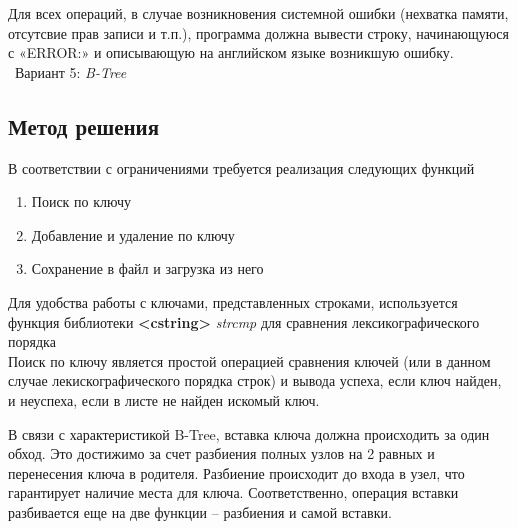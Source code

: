 \documentclass[12pt]{article}
\begin{document}
Для всех операций, в случае возникновения системной ошибки (нехватка памяти, отсутсвие прав записи и т.п.), программа должна вывести строку, начинающуюся с «ERROR:» и описывающую на английском языке возникшую ошибку.\\
  
 \ Вариант 5: \textit{B-Tree}

\subsection*{Метод решения}


В соответствии с ограничениями требуется реализация следующих функций
\begin{enumerate}
\item Поиск по ключу
\item Добавление и удаление по ключу
\item Сохранение в файл и загрузка из него
\end{enumerate}
Для удобства работы с ключами, представленных строками, используется функция библиотеки \textbf{<cstring>} \textit{strcmp} для сравнения лексикографического порядка \\

Поиск по ключу является простой операцией сравнения ключей (или в данном случае лекискографического порядка строк) и вывода успеха, если ключ найден, и неуспеха, если в листе не найден искомый ключ.

В связи с характеристикой B-Tree, вставка ключа должна происходить за один обход. Это достижимо за счет разбиения полных узлов на 2 равных и перенесения ключа в родителя. Разбиение происходит до входа в узел, что гарантирует наличие места для ключа. Соответственно, операция вставки разбивается еще на две функции \--- разбиения и самой вставки.
\end{document}
